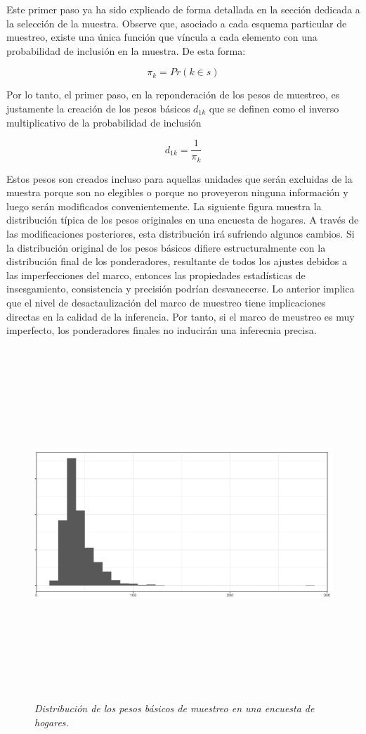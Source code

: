\documentclass[12pt,spanish,]{book}
\begin{document}
Este primer paso ya ha sido explicado de forma detallada en la sección dedicada a la selección de la muestra. Observe que, asociado a cada esquema particular de muestreo, existe una única función que víncula a cada elemento con una probabilidad de inclusión en la muestra. De esta forma:

\[\pi_k = Pr (k \in s)\]

Por lo tanto, el primer paso, en la reponderación de los pesos de muestreo, es justamente la creación de los pesos básicos \(d_{1k}\) que se definen como el inverso multiplicativo de la probabilidad de inclusión

\[d_{1k} = \frac{1}{\pi_k}\]

Estos pesos son creados incluso para aquellas unidades que serán excluidas de la muestra porque son no elegibles o porque no proveyeron ninguna información y luego serán modificados convenientemente. La siguiente figura muestra la distribución típica de los pesos originales en una encuesta de hogares. A través de las modificaciones posteriores, esta distribución irá sufriendo algunos cambios. Si la distribución original de los pesos básicos difiere estructuralmente con la distribución final de los ponderadores, resultante de todos los ajustes debidos a las imperfecciones del marco, entonces las propiedades estadísticas de insesgamiento, consistencia y precisión podrían desvanecerse. Lo anterior implica que el nivel de desactaulización del marco de muestreo tiene implicaciones directas en la calidad de la inferencia. Por tanto, si el marco de meustreo es muy imperfecto, los ponderadores finales no inducirán una inferecnia precisa.

\begin{figure}
\centering
\includegraphics[width=\textwidth,height=5.20833in]{Pics/15.png}
\caption{\emph{Distribución de los pesos básicos de muestreo en una encuesta de hogares.}}
\end{figure}
\end{document}
